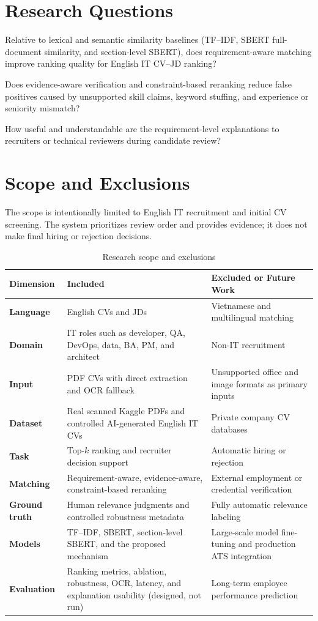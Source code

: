\documentclass[12pt,a4paper,oneside]{report}
\begin{document}
\section{Research Questions}
\begin{description}[style=nextline,leftmargin=0cm,labelsep=0pt]
  \item[RQ1] Relative to lexical and semantic similarity baselines (TF--IDF, SBERT full-document similarity, and section-level SBERT), does requirement-aware matching improve ranking quality for English IT CV--JD ranking?
  \item[RQ2] Does evidence-aware verification and constraint-based reranking reduce false positives caused by unsupported skill claims, keyword stuffing, and experience or seniority mismatch?
  \item[RQ3] How useful and understandable are the requirement-level explanations to recruiters or technical reviewers during candidate review?
\end{description}

\section{Scope and Exclusions}
The scope is intentionally limited to English IT recruitment and initial CV screening. The system prioritizes review order and provides evidence; it does not make final hiring or rejection decisions.

\begin{table}[htbp]
\centering
\caption{Research scope and exclusions}
\label{tab:scope}
\begin{tabularx}{\textwidth}{>{\bfseries}p{}XX}
\toprule
Dimension & Included & Excluded or Future Work \\
\midrule
Language & English CVs and JDs & Vietnamese and multilingual matching \\
Domain & IT roles such as developer, QA, DevOps, data, BA, PM, and architect & Non-IT recruitment \\
Input & PDF CVs with direct extraction and OCR fallback & Unsupported office and image formats as primary inputs \\
Dataset & Real scanned Kaggle PDFs and controlled AI-generated English IT CVs & Private company CV databases \\
Task & Top-$k$ ranking and recruiter decision support & Automatic hiring or rejection \\
Matching & Requirement-aware, evidence-aware, constraint-based reranking & External employment or credential verification \\
Ground truth & Human relevance judgments and controlled robustness metadata & Fully automatic relevance labeling \\
Models & TF--IDF, SBERT, section-level SBERT, and the proposed mechanism & Large-scale model fine-tuning and production ATS integration \\
Evaluation & Ranking metrics, ablation, robustness, OCR, latency, and explanation usability (designed, not run) & Long-term employee performance prediction \\
\bottomrule
\end{tabularx}
\end{table}
\end{document}
